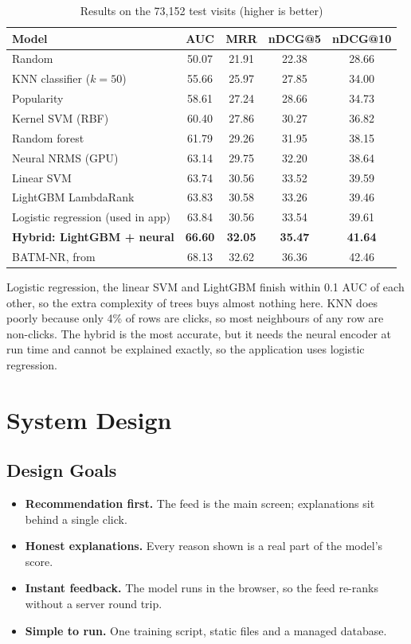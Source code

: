 \documentclass[12pt,a4paper,oneside]{report}
\begin{document}
\begin{table}[H]
\centering
\caption{Results on the 73,152 test visits (higher is better)}
\label{tab:results}
\begin{tabular}{lcccc}
\toprule
Model & AUC & MRR & nDCG@5 & nDCG@10 \\
\midrule
Random & 50.07 & 21.91 & 22.38 & 28.66 \\
KNN classifier ($k=50$) & 55.66 & 25.97 & 27.85 & 34.00 \\
Popularity & 58.61 & 27.24 & 28.66 & 34.73 \\
Kernel SVM (RBF) & 60.40 & 27.86 & 30.27 & 36.82 \\
Random forest & 61.79 & 29.26 & 31.95 & 38.15 \\
Neural NRMS (GPU) & 63.14 & 29.75 & 32.20 & 38.64 \\
Linear SVM & 63.74 & 30.56 & 33.52 & 39.59 \\
LightGBM LambdaRank & 63.83 & 30.58 & 33.26 & 39.46 \\
Logistic regression (used in app) & 63.84 & 30.56 & 33.54 & 39.61 \\
\textbf{Hybrid: LightGBM + neural} & \textbf{66.60} & \textbf{32.05} & \textbf{35.47} & \textbf{41.64} \\
\midrule
BATM-NR, from \cite{liu2024} & 68.13 & 32.62 & 36.36 & 42.46 \\
\bottomrule
\end{tabular}
\end{table}

Logistic regression, the linear SVM and LightGBM finish within 0.1 AUC of each other, so the extra
complexity of trees buys almost nothing here. KNN does poorly because only 4\% of rows are clicks, so most
neighbours of any row are non-clicks. The hybrid is the most accurate, but it needs the neural encoder at
run time and cannot be explained exactly, so the application uses logistic regression.

\chapter{System Design}

\section{Design Goals}
\begin{itemize}
  \item \textbf{Recommendation first.} The feed is the main screen; explanations sit behind a single click.
  \item \textbf{Honest explanations.} Every reason shown is a real part of the model's score.
  \item \textbf{Instant feedback.} The model runs in the browser, so the feed re-ranks without a server
        round trip.
  \item \textbf{Simple to run.} One training script, static files and a managed database.
\end{itemize}
\end{document}
